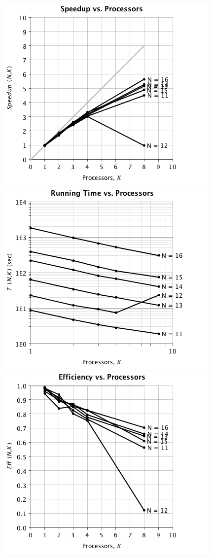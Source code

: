 \begin{figure}
\begin{center}
\includegraphics[scale=0.35]{./chapter_optimize/t1m_4.png}
\includegraphics[scale=0.35]{./chapter_optimize/t1m_1.png}
\includegraphics[scale=0.35]{./chapter_optimize/t1m_3.png}

\end{center}
\end{figure}
